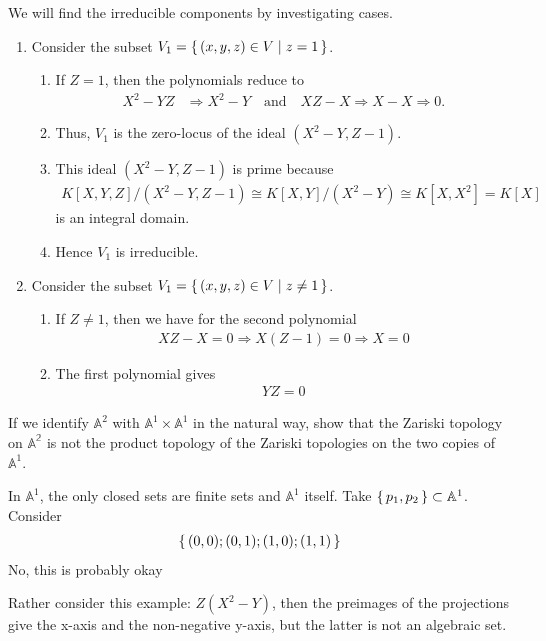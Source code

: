\begin{solution}
    We will find the irreducible components by investigating cases.
    \begin{enumerate}
        \item Consider the subset \(V_1 = \left\{\, (x, y, z) \in V \mathrel{\mid} z = 1 \,\right\}\).
        \begin{enumerate}
            \item If \(Z = 1\), then the polynomials reduce to
            \begin{align*}
                X^2 - YZ &\Rightarrow X^2 - Y \quad \text{and} \quad XZ - X \Rightarrow X - X \Rightarrow 0 \text{.}
            \end{align*}
            \item Thus, \(V_1\) is the zero-locus of the ideal \((X^2 - Y, Z - 1)\).
            \item This ideal \((X^2 - Y, Z - 1)\) is prime because
            \begin{align*}
                K[X, Y, Z] / (X^2 - Y, Z - 1) \cong K[X, Y]/(X^2- Y) \cong K[X, X^2] = K[X]
            \end{align*}
            is an integral domain.
            \item Hence \(V_1\) is irreducible.
        \end{enumerate}
        \item Consider the subset \(V_1 = \left\{\, (x, y, z) \in V \mathrel{\mid} z \neq 1 \,\right\}\).
        \begin{enumerate}
            \item If \(Z \neq 1\), then we have for the second polynomial
            \begin{align*}
                XZ - X = 0 \Rightarrow X (Z - 1) = 0 \Rightarrow X = 0
            \end{align*}
            \item The first polynomial gives
            \begin{align*}
                YZ = 0
            \end{align*}
        \end{enumerate}
    \end{enumerate}
\end{solution}

    

\begin{exercise}
    If we identify \(\mathbb{A}^2\) with \(\mathbb{A}^1 \times \mathbb{A}^1\) in the natural way, show that the Zariski topology on \(\mathbb{A^2}\) is not the product topology of the Zariski topologies on the two copies of \(\mathbb{A}^1\).
\end{exercise}
\begin{solution}
    In \(\mathbb{A}^1\), the only closed sets are finite sets and \(\mathbb{A}^1\) itself. Take \(\left\{\, p_1, p_2 \,\right\} \subset \mathbb{A}^1\). Consider
    \begin{align*}
        \left\{\, (0, 0); (0, 1); (1, 0); (1, 1) \,\right\}
    \end{align*}
    No, this is probably okay

    Rather consider this example: \(Z(X^2 - Y)\), then the preimages of the projections give the x-axis and the non-negative y-axis, but the latter is not an algebraic set.
\end{solution}